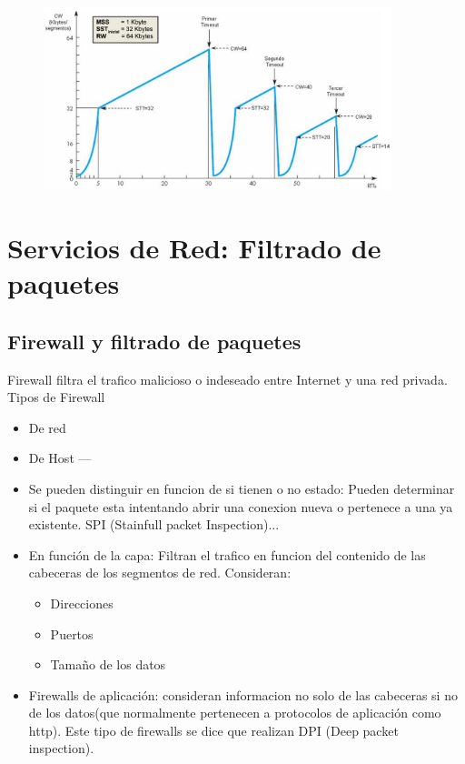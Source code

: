 \begin{itemize}
\begin{enumerate}
    \end{enumerate}
        \begin{figure}[H] \centering
        \includegraphics[width=0.9\textwidth]{img/TCP_congtimeout.png}\end{figure}
\end{itemize}


\newpage
\section{Servicios de Red: Filtrado de paquetes}
\subsection{Firewall y filtrado de paquetes}
Firewall filtra el trafico malicioso o indeseado entre Internet y una red privada.
Tipos de Firewall
\begin{itemize}
    \item De red
    \item De Host
    ---
    \item Se pueden distinguir en funcion de si tienen o no estado: Pueden determinar si el paquete esta intentando abrir una conexion nueva o pertenece a una ya existente.
    SPI (Stainfull packet Inspection)...
    \item En función de la capa: Filtran el trafico en funcion del contenido de las cabeceras de los segmentos de red. Consideran:
    \begin{itemize}
        \item Direcciones
        \item Puertos   
        \item Tamaño de los datos
    \end{itemize}

    \item Firewalls de aplicación: consideran informacion no solo de las cabeceras si no de los datos(que normalmente pertenecen a protocolos de aplicación como http). Este tipo de firewalls se dice que realizan DPI (Deep packet inspection).
\end{itemize}

